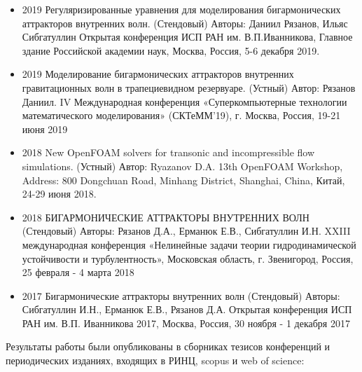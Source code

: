 \documentclass[utf8x]{G7-32} %
\begin{document}
\begin{itemize}

    \item 2019 Регуляризированные уравнения для моделирования бигармонических аттракторов внутренних волн. (Стендовый) Авторы: Даниил Рязанов, Ильяс Сибгатуллин Открытая конференция ИСП РАН им. В.П.Иванникова, Главное здание Российской академии наук, Москва, Россия, 5-6 декабря 2019.
    
    \item 2019 Моделирование бигармонических аттракторов внутренних гравитационных волн в трапециевидном резервуаре. (Устный) Автор: Рязанов Даниил. IV Международная конференция «Суперкомпьютерные технологии математического моделирования» (СКТеММ’19), г. Москва, Россия, 19-21 июня 2019
    
    \item 2018 New OpenFOAM solvers for transonic and incompressible flow simulations. (Устный) Автор: Ryazanov D.A. 13th OpenFOAM Workshop, Address: 800 Dongchuan Road, Minhang District, Shanghai, China, Китай, 24-29 июня 2018.
    
    \item 2018 БИГАРМОНИЧЕСКИЕ АТТРАКТОРЫ ВНУТРЕННИХ ВОЛН (Стендовый) Авторы: Рязанов Д.А., Ерманюк Е.В., Сибгатуллин И.Н. XXIII международная конференция «Нелинейные задачи теории гидродинамической устойчивости и турбулентность», Московская область, г. Звенигород, Россия, 25 февраля - 4 марта 2018
    
    \item 2017 Бигармонические аттракторы внутренних волн (Стендовый) Авторы: Сибгатуллин И.Н., Ерманюк Е.В., Рязанов Д.А. Открытая конференция ИСП РАН им. В.П. Иванникова 2017, Москва, Россия, 30 ноября - 1 декабря 2017
    
\end{itemize}

Результаты работы были опубликованы в сборниках тезисов конференций и периодических изданиях, входящих в РИНЦ, scopus и web of science:
\end{document}
